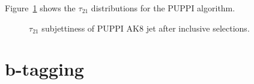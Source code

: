 Figure~\ref{fig:fatjet_pre_tau21} shows the $\tau_{21}$ distributions for the PUPPI algorithm.

\begin{figure}[!htb]
  \begin{center}
  \end{center}
  \caption{$\tau_{21}$ subjettiness of PUPPI AK8 jet after inclusive selections.}
  \label{fig:fatjet_pre_tau21}
\end{figure}



\section{b-tagging}\label{ssec:btagging}
 
